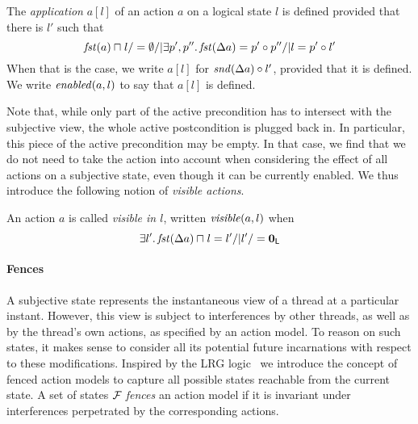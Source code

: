 \begin{definition}
  The \emph{application} $a[l]$ of an action $a$ on a logical state
  $l$ is defined provided that there is $l'$ such that
  \[
    \mathit{fst}(a) \sqcap_{} l /=\emptyset /|
    \exists p',p''.\,
    \mathit{fst}(\Delta {a}) = p'\circ p'' /|
    l = p' \circ l'
  \]
  When that is the case, we write $a[l]$ for
  $\mathit{snd}(\Delta {a})\circ l'$, provided that it is defined. We
  write $\mathit{enabled}(a,l)$ to say that $a[l]$ is defined.
\end{definition}

Note that, while only part of the active precondition has to intersect
with the subjective view, the whole active postcondition is plugged
back in. In particular, this piece of the active precondition may be
empty. In that case, we find that we do not need to take the action
into account when considering the effect of all actions on a
subjective state, even though it can be currently enabled. We thus
introduce the following notion of \emph{visible actions}.

\begin{definition}
  An action $a$ is called \emph{visible in $l$}, written
  $\mathit{visible}(a,l)$ when
  \[
  \exists l'.\, \mathit{fst}(\Delta {a})\sqcap_{} l = l' /| l'/=\mathbf{0}_{\textsf{L}}
  \]
\end{definition}


\paragraph{Fences}
A subjective state represents the instantaneous view of a thread at a
particular instant. However, this view is subject to interferences by
other threads, as well as by the thread's own actions, as specified by
an action model. To reason on such states, it makes sense to consider
all its potential future incarnations with respect to these
modifications.  Inspired by the LRG logic~\cite{lrg} we introduce the
concept of fenced action models to capture all possible states
reachable from the current state. A set of states $\mathcal{F}_{}$
\emph{fences} an action model if it is invariant under interferences
perpetrated by the corresponding actions.


